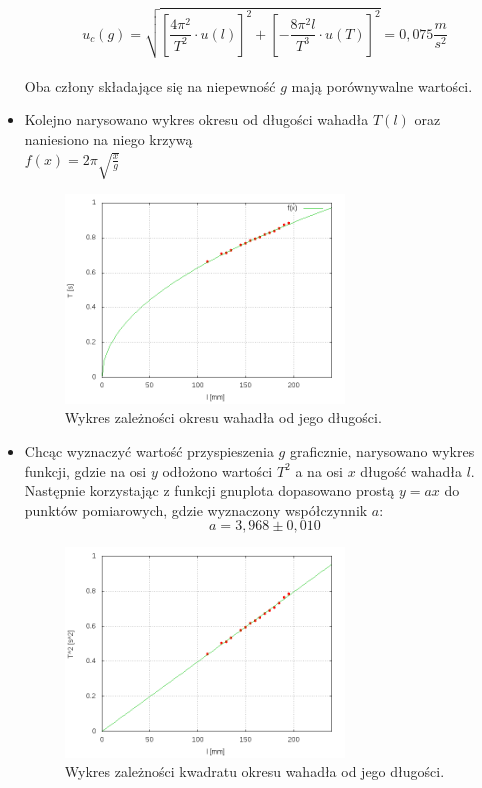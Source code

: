 \documentclass{article}
\begin{document}
\begin{itemize}
		\begin{equation*}
			u_c(g) = \sqrt{ \left[ \frac{4\pi^2}{T^2}\cdot u(l) \right]^2 + \left[ -\frac{8\pi^2 l}{T^3} \cdot u(T) \right]^2 }
			 = 	0,075 \frac{m}{s^2}
		\end{equation*}\\
	Oba człony składające się na niepewność $g$ mają porównywalne wartości.\\
	
	
	
	\item Kolejno narysowano wykres okresu od długości wahadła $T(l)$ oraz naniesiono na niego krzywą \\
	$f(x)=2\pi\sqrt{\frac{x}{g}}$\\
	
	\begin{figure}[ht]
		\centering
		\includegraphics[width=0.7\textwidth]{wykres_T/wykres1.png}
		\caption{Wykres zależności okresu wahadła od jego długości.}
		\label{wykres1}
	\end{figure}
	
	
	
	\item Chcąc wyznaczyć wartość przyspieszenia $g$ graficznie, narysowano wykres funkcji, 
	gdzie na osi $y$ odłożono wartości $T^2$ a na osi $x$ długość wahadła $l$. Następnie korzystając z funkcji gnuplota dopasowano prostą $y=ax$ do punktów pomiarowych, gdzie wyznaczony współczynnik $a$: \\
	\[a = 3,968 \pm 0,010
	\]
	
	\begin{figure}[ht]
		\centering
		\includegraphics[width=0.7\textwidth]{wykres_T2/wykres2.png}
		\caption{Wykres zależności kwadratu okresu wahadła od jego długości.}
		\label{wykres2}
	\end{figure}
	

\end{itemize}
\end{document}

